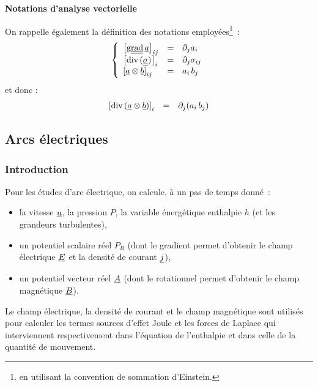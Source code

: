 \vspace*{0,5cm}
{\bf Notations d'analyse vectorielle}
\nopagebreak

On rappelle \'egalement la d\'efinition des notations employ\'ees\footnote{en
utilisant la convention de sommation d'Einstein.}~:
\begin{equation}\notag
\left\{\begin{array}{lll}
\left[\text{g}\underline{\underline{{\text{rad}}}}\,{\underline{a}}\right]_{ij} &=& \partial_j a_i\\
\left[\text{div}\,(\underline{\underline{\sigma}})\right]_i &=& \partial_j \sigma_{ij}\\
\left[\underline{a}\otimes\underline{b}\right]_{ij} &= &
a_i\,b_j\\
\end{array}\right.
\end{equation}
et donc :
\begin{equation}\notag
\begin{array}{lll}
\left[\text{div}\,(\underline{a}\otimes\underline{b})\right]_i &= &
\partial_j (a_i\,b_j)
\end{array}
\end{equation}


\subsection*{Arcs \'electriques}

\subsubsection*{Introduction}

Pour les \'etudes d'arc \'electrique, on calcule,
\`a un pas de temps donn\'e~:
\begin{itemize}
\item la vitesse $\underline{u}$, la pression $P$, la variable \'energ\'etique
enthalpie $h$ (et les grandeurs turbulentes),
\item un potentiel scalaire r\'eel $P_R$
(dont le gradient permet d'obtenir le champ \'electrique $\underline{E}$ et
la densit\'e de courant $\underline{j}$),
\item un potentiel vecteur r\'eel $\underline{A}$ (dont
le rotationnel permet d'obtenir  le champ magn\'etique $\underline{B}$).
\end{itemize}

\bigskip
Le champ \'electrique, la
densit\'e de courant et le champ magn\'etique sont utilis\'es pour calculer les
termes sources d'effet Joule et les forces de Laplace qui interviennent
respectivement dans l'\'equation de l'enthalpie et dans celle
de la quantit\'e de mouvement.


